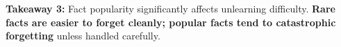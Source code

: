 \begin{tcolorbox}[colback=gray!10, colframe=black!50, 
  boxrule=0.5pt, arc=3pt, left=6pt, right=6pt, top=4pt, bottom=4pt]
\textbf{Takeaway 3:} Fact popularity significantly affects unlearning difficulty. \textbf{Rare facts are easier to forget cleanly; popular facts tend to catastrophic forgetting }unless handled carefully.
\end{tcolorbox}






